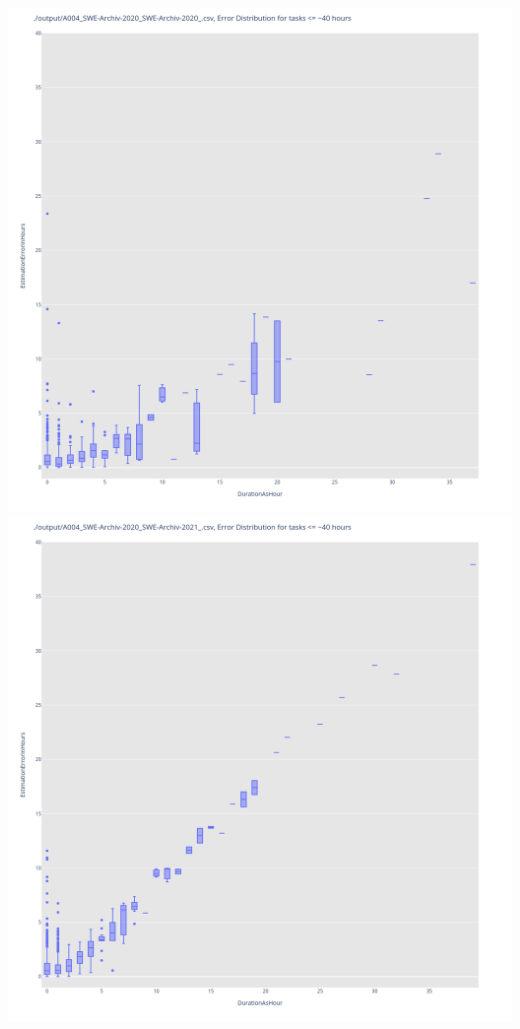 \includegraphics[width=\textwidth]{Scripts/output/A004_SWE-Archiv-2020_SWE-Archiv-2020_.csv.error_distribution.png}
\includegraphics[width=\textwidth]{Scripts/output/A004_SWE-Archiv-2020_SWE-Archiv-2021_.csv.error_distribution.png}
